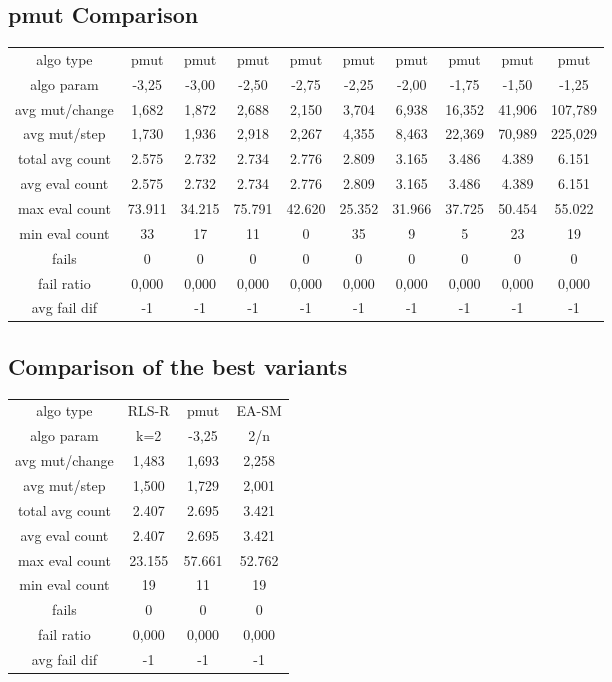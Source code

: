 \subsection{pmut Comparison}

\begin{tabular}[h]{cccccccccc}
algo type&           pmut&    pmut&    pmut&    pmut&    pmut&    pmut&    pmut&    pmut&    pmut\\
algo param&         -3,25&   -3,00&   -2,50&   -2,75&   -2,25&   -2,00&   -1,75&   -1,50&   -1,25\\
avg mut/change&     1,682&   1,872&   2,688&   2,150&   3,704&   6,938&  16,352&  41,906& 107,789\\
avg mut/step&       1,730&   1,936&   2,918&   2,267&   4,355&   8,463&  22,369&  70,989& 225,029\\
\hline
total avg count&    2.575&   2.732&   2.734&   2.776&   2.809&   3.165&   3.486&   4.389&   6.151\\
avg eval count&     2.575&   2.732&   2.734&   2.776&   2.809&   3.165&   3.486&   4.389&   6.151\\
max eval count&    73.911&  34.215&  75.791&  42.620&  25.352&  31.966&  37.725&  50.454&  55.022\\
min eval count&        33&      17&      11&       0&      35&       9&       5&      23&      19\\
\hline
fails&                  0&       0&       0&       0&       0&       0&       0&       0&       0\\
fail ratio&         0,000&   0,000&   0,000&   0,000&   0,000&   0,000&   0,000&   0,000&   0,000\\
avg fail dif&          -1&      -1&      -1&      -1&      -1&      -1&      -1&      -1&      -1\\
\end{tabular}

\subsection{Comparison of the best variants}

\begin{tabular}[h]{cccc}
algo type&         RLS-R&   pmut&  EA-SM\\
algo param&          k=2&  -3,25&    2/n\\
avg mut/change&    1,483&  1,693&  2,258\\
avg mut/step&      1,500&  1,729&  2,001\\
\hline
total avg count&   2.407&  2.695&  3.421\\
avg eval count&    2.407&  2.695&  3.421\\
max eval count&   23.155& 57.661& 52.762\\
min eval count&       19&     11&     19\\
\hline
fails&                 0&      0&      0\\
fail ratio&        0,000&  0,000&  0,000\\
avg fail dif&         -1&     -1&     -1\\
\end{tabular}


